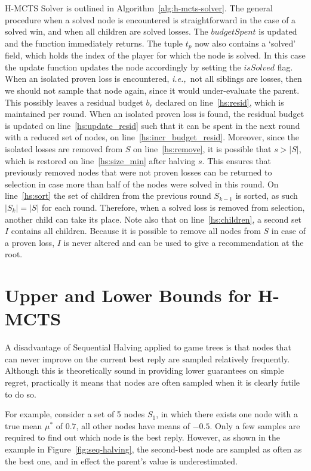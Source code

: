 \documentclass{kecsmstr}
\newcommand{\ie}{{\it i.e.,}~}
\newcommand{\func}[1]{{\sc #1}}
\begin{document}
\DecMargin{1em}
\newpage
H-MCTS Solver is outlined in Algorithm~\ref{alg:h-mcts-solver}. The general procedure when a solved node is encountered is straightforward in the case of a solved win, and when all children are solved losses. The $budgetSpent$ is updated and the function immediately returns. The tuple $t_p$ now also contains a `solved' field, which holds the index of the player for which the node is solved. In this case the \func{update} function updates the node accordingly by setting the $isSolved$ flag. When an isolated proven loss is encountered, \ie not all siblings are losses, then we should not sample that node again, since it would under-evaluate the parent. This possibly leaves a residual budget $b_r$ declared on line~\ref{hs:resid}, which is maintained per round. When an isolated proven loss is found, the residual budget is updated on line~\ref{hs:update_resid} such that it can be spent in the next round with a reduced set of nodes, on line~\ref{hs:incr_budget_resid}. Moreover, since the isolated losses are removed from $S$ on line~\ref{hs:remove}, it is possible that $s > |S|$, which is restored on line~\ref{hs:size_min} after halving $s$. This ensures that previously removed nodes that were not proven losses can be returned to selection in case more than half of the nodes were solved in this round. On line~\ref{hs:sort} the set of children from the previous round $S_{k-1}$ is sorted, as such $|S_k| = |S|$ for each round. Therefore, when a solved loss is removed from selection, another child can take its place. Note also that on line~\ref{hs:children}, a second set $I$ contains all children. Because it is possible to remove all nodes from $S$ in case of a proven loss, $I$ is never altered and can be used to give a recommendation at the root.

\section{Upper and Lower Bounds for H-MCTS}
\label{sec:ulb_h-mcts}
A disadvantage of Sequential Halving applied to game trees is that nodes that can never improve on the current best reply are sampled relatively frequently. Although this is theoretically sound in providing lower guarantees on simple regret, practically it means that nodes are often sampled when it is clearly futile to do so. 

For example, consider a set of 5 nodes $S_1$, in which there exists one node with a true mean $\mu^*$ of $0.7$, all other nodes have means of $-0.5$. Only a few samples are required to find out which node is the best reply. However, as shown in the example in Figure~\ref{fig:seq-halving}, the second-best node are sampled as often as the best one, and in effect the parent's value is underestimated. 
\end{document}
